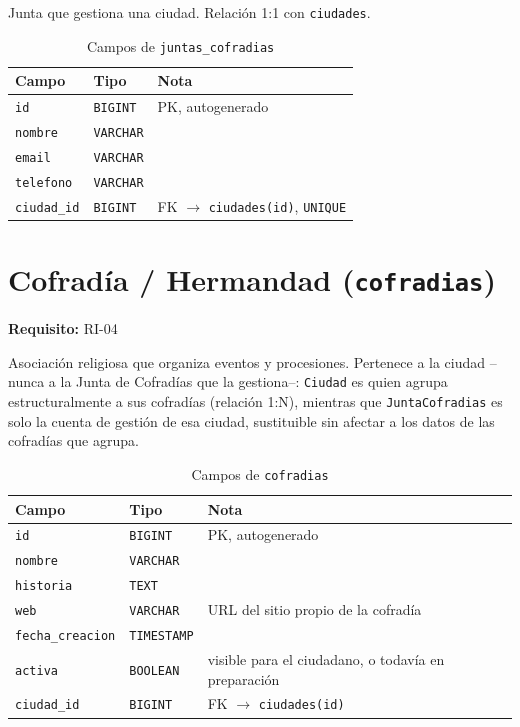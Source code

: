 Junta que gestiona una ciudad. Relación 1:1 con \texttt{ciudades}.

\begin{table}[H]
\centering
\begin{tabular}{|l|l|p{7cm}|}
\hline
\textbf{Campo} & \textbf{Tipo} & \textbf{Nota} \\
\hline
\texttt{id} & \texttt{BIGINT} & PK, autogenerado \\
\hline
\texttt{nombre} & \texttt{VARCHAR} &  \\
\hline
\texttt{email} & \texttt{VARCHAR} &  \\
\hline
\texttt{telefono} & \texttt{VARCHAR} &  \\
\hline
\texttt{ciudad\_id} & \texttt{BIGINT} & FK $\to$ \texttt{ciudades(id)}, \texttt{UNIQUE} \\
\hline
\end{tabular}
\caption{Campos de \texttt{juntas\_cofradias}}
\end{table}

\section{Cofradía / Hermandad (\texttt{cofradias})}
\textbf{Requisito:} RI-04

Asociación religiosa que organiza eventos y procesiones. Pertenece a la ciudad --nunca a la Junta de Cofradías que la gestiona--: \texttt{Ciudad} es quien agrupa estructuralmente a sus cofradías (relación 1:N), mientras que \texttt{JuntaCofradias} es solo la cuenta de gestión de esa ciudad, sustituible sin afectar a los datos de las cofradías que agrupa.

\begin{table}[H]
\centering
\begin{tabular}{|l|l|p{7cm}|}
\hline
\textbf{Campo} & \textbf{Tipo} & \textbf{Nota} \\
\hline
\texttt{id} & \texttt{BIGINT} & PK, autogenerado \\
\hline
\texttt{nombre} & \texttt{VARCHAR} &  \\
\hline
\texttt{historia} & \texttt{TEXT} &  \\
\hline
\texttt{web} & \texttt{VARCHAR} & URL del sitio propio de la cofradía \\
\hline
\texttt{fecha\_creacion} & \texttt{TIMESTAMP} &  \\
\hline
\texttt{activa} & \texttt{BOOLEAN} & visible para el ciudadano, o todavía en preparación \\
\hline
\texttt{ciudad\_id} & \texttt{BIGINT} & FK $\to$ \texttt{ciudades(id)} \\
\hline
\end{tabular}
\caption{Campos de \texttt{cofradias}}
\end{table}

